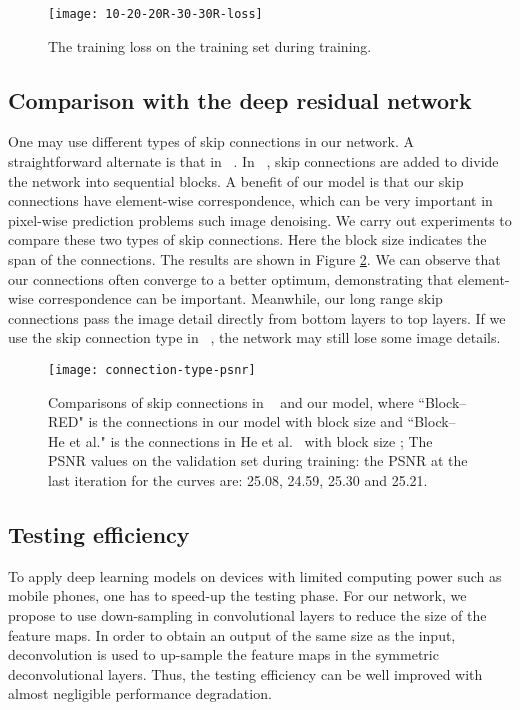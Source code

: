 \documentclass[10pt,journal,compsoc]{IEEEtran}
\begin{document}
\begin{figure}[b!]
\centering
\texttt{[image: 10-20-20R-30-30R-loss]}
\caption{The training loss on the training set during training.}
\label{fig6}
\end{figure}



\subsection{Comparison with the deep residual network \cite{DBLP:journals/corr/HeZRS15}}

One may use different types of skip connections in our network. A straightforward
alternate is that in ~\cite{DBLP:journals/corr/HeZRS15}. In ~\cite{DBLP:journals/corr/HeZRS15},
 skip connections are added to divide the network into sequential blocks. A benefit
of our model is that our skip connections have element-wise correspondence, which can be
very important in pixel-wise prediction problems such image denoising. We carry out
experiments to compare these two types of skip connections. Here the block size indicates
the span of the connections. The results are shown in Figure \ref{fig8}. We can observe
that our connections often converge to a better optimum, demonstrating that element-wise
correspondence can be important. Meanwhile, our long range skip connections pass the image
detail directly from bottom layers to top layers. If we use the skip connection type in
~\cite{DBLP:journals/corr/HeZRS15}, the network may still lose some image details.


\begin{figure}[t!]
\centering
\texttt{[image: connection-type-psnr]}
\caption{Comparisons of skip connections in ~\cite{DBLP:journals/corr/HeZRS15} and our
model, where ``Block--RED" is the connections in our model with block size  and
``Block--He et al." is the connections in He et al.~\cite{DBLP:journals/corr/HeZRS15}
with block size ; The PSNR values on the validation set during training: the PSNR at
the last iteration for the curves are: 25.08, 24.59, 25.30 and 25.21.}
\label{fig8}
\end{figure}


\subsection{Testing efficiency}

To apply deep learning models on devices with limited computing power such as mobile
phones, one has to speed-up the testing phase. For our network, we propose to use
down-sampling in convolutional layers to reduce the size of the feature maps. In order
to obtain an output of the same size as the input, deconvolution is used to up-sample
the feature maps in the symmetric deconvolutional layers.  Thus, the testing
efficiency can be well improved with almost negligible  performance degradation.
\end{document}
